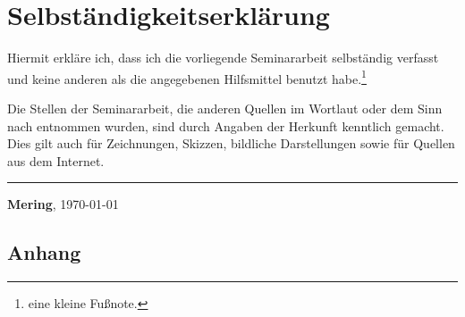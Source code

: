 \lipsum[41]


\newpage
\section{Selbständigkeitserklärung}
Hiermit erkläre ich, dass ich die vorliegende Seminararbeit selbständig verfasst und keine anderen als die angegebenen Hilfsmittel benutzt habe.\footnote{eine kleine Fußnote.}

Die Stellen der Seminararbeit, die anderen Quellen im Wortlaut oder dem Sinn nach entnommen wurden, sind durch Angaben der Herkunft kenntlich gemacht. Dies gilt auch für Zeichnungen, Skizzen, bildliche Darstellungen sowie für Quellen aus dem Internet.

\vspace{20mm}
\hrule
\vspace{5mm}
\begin{center}
\textbf{Mering}, \today
\end{center}


\newpage
\listoffigures		%

\newpage
\listoftables		%

\newpage
{}
\small 						








\newpage
\appendix
{}
\begin{appendix}
\section*{Anhang}
\end{appendix}
